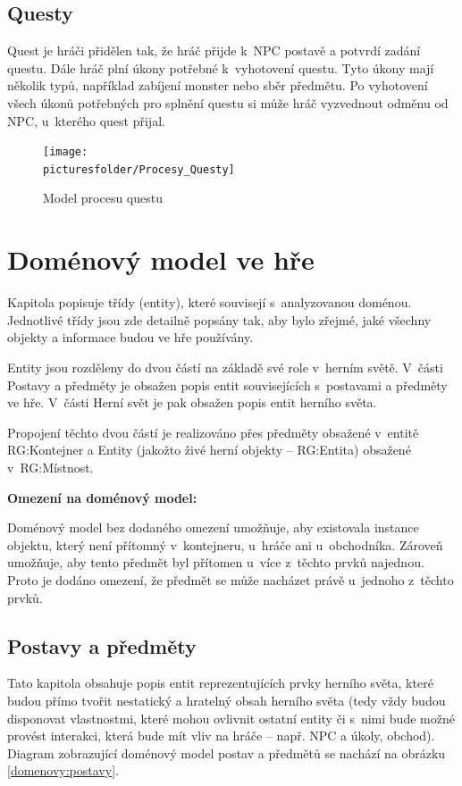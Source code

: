 \documentclass[12pt,a4paper]{article}
\def\picturesfolder{obrazky}
\begin{document}
\subsection{Questy} \label{procesy:questy}
Quest je hráči přidělen tak, že hráč přijde k~NPC postavě a potvrdí zadání
questu. Dále hráč plní úkony potřebné k~vyhotovení questu. Tyto úkony mají
několik typů, například zabíjení monster nebo sběr předmětu. Po vyhotovení všech
úkonů potřebných pro splnění questu si může hráč vyzvednout odměnu od NPC,
u~kterého quest přijal.

\begin{figure}
\begin{center}
\texttt{[image: \\picturesfolder/Procesy\_Questy]}
  \caption{Model procesu questu}
  \label{process:quest}
\end{center}
\end{figure}

\newpage


\section{Doménový model ve hře}
Kapitola popisuje třídy (entity), které souvisejí s~analyzovanou doménou.
Jednotlivé třídy jsou zde detailně popsány tak, aby bylo zřejmé, jaké všechny
objekty a informace budou ve hře používány.

Entity jsou rozděleny do dvou částí na základě své role v~herním světě. V~části
Postavy a předměty je obsažen popis entit souvisejících s~postavami a předměty
ve hře.  V~části Herní svět je pak obsažen popis entit herního světa.

Propojení těchto dvou částí je realizováno přes předměty obsažené v~entitě
RG:Kontejner a Entity (jakožto živé herní objekty -- RG:Entita) obsažené
v~RG:Místnost.

\bigskip
\noindent
\bf
Omezení na doménový model:
\rm

Doménový model bez dodaného omezení umožňuje, aby existovala instance objektu,
který není přítomný v~kontejneru, u~hráče ani u~obchodníka. Zároveň umožňuje,
aby tento předmět byl přítomen u~více z~těchto prvků najednou. Proto je dodáno
omezení, že předmět se může nacházet právě u~jednoho z~těchto prvků.

\subsection{Postavy a předměty}
Tato kapitola obsahuje popis entit reprezentujících prvky herního světa, které
budou přímo tvořit nestatický a hratelný obsah herního světa (tedy vždy budou
disponovat vlastnostmi, které mohou ovlivnit ostatní entity či s~nimi bude možné
provést interakci, která bude mít vliv na hráče -- např. NPC a úkoly, obchod).
Diagram zobrazující doménový model postav a předmětů se nachází na obrázku
\ref{domenovy:postavy}.
\end{document}
